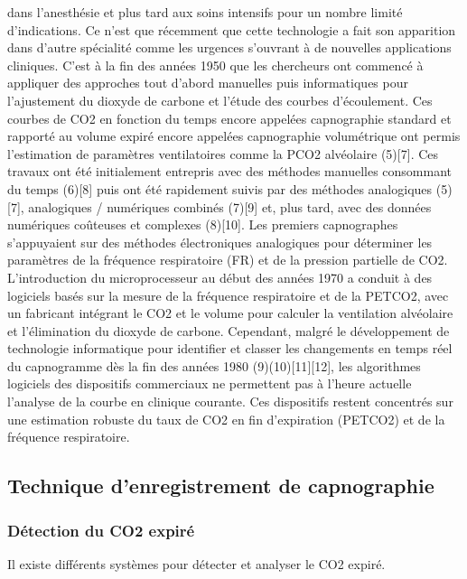 \documentclass[12pt,]{article}
\begin{document}
dans l'anesthésie et plus tard aux soins intensifs pour un nombre limité
d'indications. Ce n'est que récemment que cette technologie a fait son
apparition dans d'autre spécialité comme les urgences s'ouvrant à de
nouvelles applications cliniques. C'est à la fin des années 1950 que les
chercheurs ont commencé à appliquer des approches tout d'abord manuelles
puis informatiques pour l'ajustement du dioxyde de carbone et l'étude
des courbes d'écoulement. Ces courbes de CO2 en fonction du temps encore
appelées capnographie standard et rapporté au volume expiré encore
appelées capnographie volumétrique ont permis l'estimation de paramètres
ventilatoires comme la PCO2 alvéolaire (5){[}7{]}. Ces travaux ont été
initialement entrepris avec des méthodes manuelles consommant du temps
(6){[}8{]} puis ont été rapidement suivis par des méthodes analogiques
(5){[}7{]}, analogiques / numériques combinés (7){[}9{]} et, plus tard,
avec des données numériques coûteuses et complexes (8){[}10{]}. Les
premiers capnographes s'appuyaient sur des méthodes électroniques
analogiques pour déterminer les paramètres de la fréquence respiratoire
(FR) et de la pression partielle de CO2. L'introduction du
microprocesseur au début des années 1970 a conduit à des logiciels basés
sur la mesure de la fréquence respiratoire et de la PETCO2, avec un
fabricant intégrant le CO2 et le volume pour calculer la ventilation
alvéolaire et l'élimination du dioxyde de carbone. Cependant, malgré le
développement de technologie informatique pour identifier et classer les
changements en temps réel du capnogramme dès la fin des années 1980
(9)(10){[}11{]}{[}12{]}, les algorithmes logiciels des dispositifs
commerciaux ne permettent pas à l'heure actuelle l'analyse de la courbe
en clinique courante. Ces dispositifs restent concentrés sur une
estimation robuste du taux de CO2 en fin d'expiration (PETCO2) et de la
fréquence respiratoire.

\subsection{Technique d'enregistrement de
capnographie}\label{technique-denregistrement-de-capnographie}

\subsubsection{Détection du CO2 expiré}\label{detection-du-co2-expire}

Il existe différents systèmes pour détecter et analyser le CO2 expiré.
\end{document}
